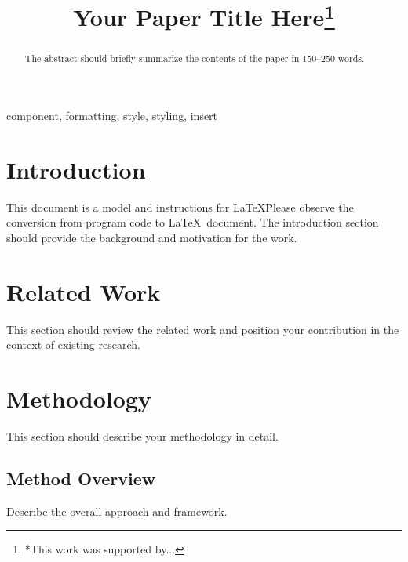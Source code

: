 \documentclass[conference]{IEEEtran}
\begin{document}
\title{Your Paper Title Here\thanks{*This work was supported by...}}

\author{
\and
{}
}

\maketitle

\begin{abstract}
The abstract should briefly summarize the contents of the paper in 150--250 words.
\end{abstract}

\begin{IEEEkeywords}
component, formatting, style, styling, insert
\end{IEEEkeywords}

\section{Introduction}
This document is a model and instructions for \LaTeX\. Please observe the
conversion from program code to \LaTeX\ document. The introduction section
should provide the background and motivation for the work.

\section{Related Work}
This section should review the related work and position your contribution
in the context of existing research.

\section{Methodology}
This section should describe your methodology in detail.

\subsection{Method Overview}
Describe the overall approach and framework.
\end{document}
